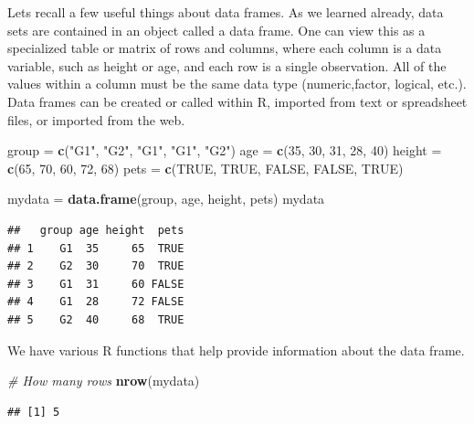 \documentclass[
]{book}
\newenvironment{Shaded}{\begin{snugshade}}{\end{snugshade}}
\newcommand{\CommentTok}[1]{\textcolor[rgb]{0.56,0.35,0.01}{\textit{#1}}}
\newcommand{\DecValTok}[1]{\textcolor[rgb]{0.00,0.00,0.81}{#1}}
\newcommand{\KeywordTok}[1]{\textcolor[rgb]{0.13,0.29,0.53}{\textbf{#1}}}
\newcommand{\NormalTok}[1]{#1}
\newcommand{\OtherTok}[1]{\textcolor[rgb]{0.56,0.35,0.01}{#1}}
\newcommand{\StringTok}[1]{\textcolor[rgb]{0.31,0.60,0.02}{#1}}
\begin{document}
Lets recall a few useful things about data frames. As we learned already, data sets are contained in an object called a data frame. One can view this as a specialized table or matrix of rows and columns, where each column is a data variable, such as height or age, and each row is a single observation. All of the values within a column must be the same data type (numeric,factor, logical, etc.). Data frames can be created or called within R, imported from text or spreadsheet files, or imported from the web.

\begin{Shaded}
\begin{Highlighting}[]
\NormalTok{group =}\StringTok{ }\KeywordTok{c}\NormalTok{(}\StringTok{"G1"}\NormalTok{, }\StringTok{"G2"}\NormalTok{, }\StringTok{"G1"}\NormalTok{, }\StringTok{"G1"}\NormalTok{, }\StringTok{"G2"}\NormalTok{)}
\NormalTok{age =}\StringTok{ }\KeywordTok{c}\NormalTok{(}\DecValTok{35}\NormalTok{, }\DecValTok{30}\NormalTok{, }\DecValTok{31}\NormalTok{, }\DecValTok{28}\NormalTok{, }\DecValTok{40}\NormalTok{)}
\NormalTok{height =}\StringTok{ }\KeywordTok{c}\NormalTok{(}\DecValTok{65}\NormalTok{, }\DecValTok{70}\NormalTok{, }\DecValTok{60}\NormalTok{, }\DecValTok{72}\NormalTok{, }\DecValTok{68}\NormalTok{)}
\NormalTok{pets =}\StringTok{ }\KeywordTok{c}\NormalTok{(}\OtherTok{TRUE}\NormalTok{, }\OtherTok{TRUE}\NormalTok{, }\OtherTok{FALSE}\NormalTok{, }\OtherTok{FALSE}\NormalTok{, }\OtherTok{TRUE}\NormalTok{)}

\NormalTok{mydata =}\StringTok{ }\KeywordTok{data.frame}\NormalTok{(group, age, height, pets)}
\NormalTok{mydata}
\end{Highlighting}
\end{Shaded}

\begin{verbatim}
##   group age height  pets
## 1    G1  35     65  TRUE
## 2    G2  30     70  TRUE
## 3    G1  31     60 FALSE
## 4    G1  28     72 FALSE
## 5    G2  40     68  TRUE
\end{verbatim}

We have various R functions that help provide information about the data frame.

\begin{Shaded}
\begin{Highlighting}[]
\CommentTok{# How many rows}
\KeywordTok{nrow}\NormalTok{(mydata)}
\end{Highlighting}
\end{Shaded}

\begin{verbatim}
## [1] 5
\end{verbatim}
\end{document}
